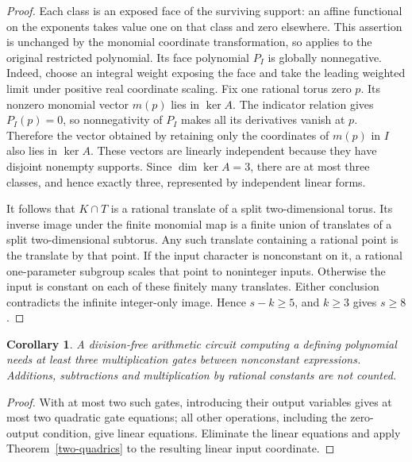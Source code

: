 \documentclass[11pt]{article}
\newtheorem{corollary}[theorem]{Corollary}
\theoremstyle{remark}\newtheorem{remark}[theorem]{Remark}
\begin{document}
\begin{proof}
Each class is an exposed face of the surviving support: an affine functional on the exponents takes value one on that class and zero elsewhere. This assertion is unchanged by the monomial coordinate transformation, so applies to the original restricted polynomial. Its face polynomial \(P_I\) is globally nonnegative. Indeed, choose an integral weight exposing the face and take the leading weighted limit under positive real coordinate scaling. Fix one rational torus zero \(p\). Its nonzero monomial vector \(m(p)\) lies in \(\ker A\). The indicator relation gives \(P_I(p)=0\), so nonnegativity of \(P_I\) makes all its derivatives vanish at \(p\). Therefore the vector obtained by retaining only the coordinates of \(m(p)\) in \(I\) also lies in \(\ker A\). These vectors are linearly independent because they have disjoint nonempty supports. Since \(\dim\ker A=3\), there are at most three classes, and hence exactly three, represented by independent linear forms.

It follows that \(K\cap T\) is a rational translate of a split two-dimensional torus. Its inverse image under the finite monomial map is a finite union of translates of a split two-dimensional subtorus. Any such translate containing a rational point is the translate by that point. If the input character is nonconstant on it, a rational one-parameter subgroup scales that point to noninteger inputs. Otherwise the input is constant on each of these finitely many translates. Either conclusion contradicts the infinite integer-only image. Hence \(s-k\ge5\), and \(k\ge3\) gives \(s\ge8\).
\end{proof}

\begin{corollary}\label{multiplication}
A division-free arithmetic circuit computing a defining polynomial needs at least three multiplication gates between nonconstant expressions. Additions, subtractions and multiplication by rational constants are not counted.
\end{corollary}
\begin{proof}
With at most two such gates, introducing their output variables gives at most two quadratic gate equations; all other operations, including the zero-output condition, give linear equations. Eliminate the linear equations and apply Theorem~\ref{two-quadrics} to the resulting linear input coordinate.
\end{proof}
\end{document}
